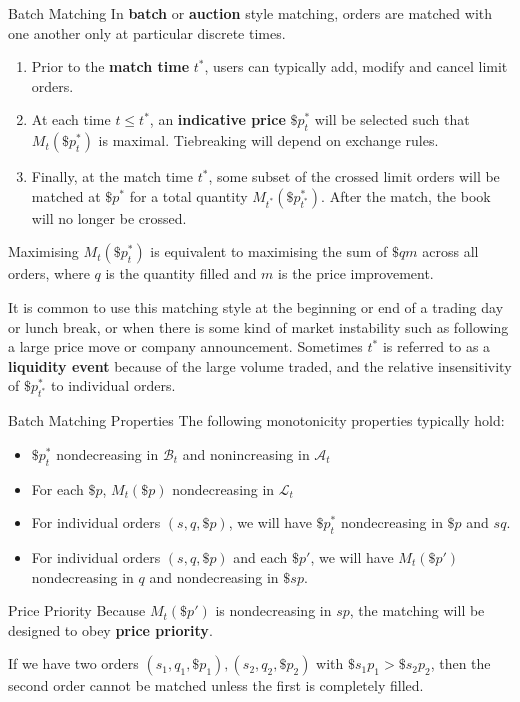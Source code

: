 \documentclass{beamer}
\begin{document}
\begin{frame}{Batch Matching}
	In \textbf{batch} or \textbf{auction} style matching, orders are matched with one another only at particular discrete times.

	\begin{enumerate}
		\item Prior to the \textbf{match time} $t^*$, users can typically add, modify and cancel limit orders.
		\item At each time $t\leq t^*$, an \textbf{indicative price} $\$p^*_t$ will be selected such that $M_t(\$p^*_t)$ is maximal. Tiebreaking will depend on exchange rules.
		\item Finally, at the match time $t^*$, some subset of the crossed limit orders will be matched at $\$p^*$ for a total quantity $M_{t^*}(\$p^*_{t^*})$. After the match, the book will no longer be crossed.
	\end{enumerate}

	\pause

	Maximising $M_t(\$p^*_t)$ is equivalent to maximising the sum of $\$qm$ across all orders, where $q$ is the quantity filled and $m$ is the price improvement.%

	It is common to use this matching style at the beginning or end of a trading day or lunch break, or when there is some kind of market instability such as following a large price move or company announcement. Sometimes $t^*$ is referred to as a \textbf{liquidity event} because of the large volume traded, and the relative insensitivity of $\$p^*_{t^*}$ to individual orders.%
\end{frame}

\begin{frame}{Batch Matching Properties}
	The following monotonicity properties typically hold:
	\begin{itemize}
		\item $\$p^*_t$ nondecreasing in $\mathcal{B}_t$ and nonincreasing in $\mathcal{A}_t$
		\item For each $\$p$, $M_t(\$p)$ nondecreasing in $\mathcal{L}_t$
		\item For individual orders $(s,q,\$p)$, we will have $\$p^*_t$ nondecreasing in $\$p$ and $sq$. %
		\item For individual orders $(s,q,\$p)$ and each $\$p'$, we will have $M_t(\$p')$ nondecreasing in $q$ and nondecreasing in $\$sp$.
	\end{itemize}

	\pause

	\begin{block}{Price Priority}
		Because $M_t(\$p')$ is nondecreasing in $sp$, the matching will be designed to obey \textbf{price priority}.
	
		If we have two orders $(s_1,q_1,\$p_1), (s_2,q_2,\$p_2)$ with $\$s_1p_1 > \$s_2p_2$, then the second order cannot be matched unless the first is completely filled.
	\end{block}
\end{frame}
\end{document}
